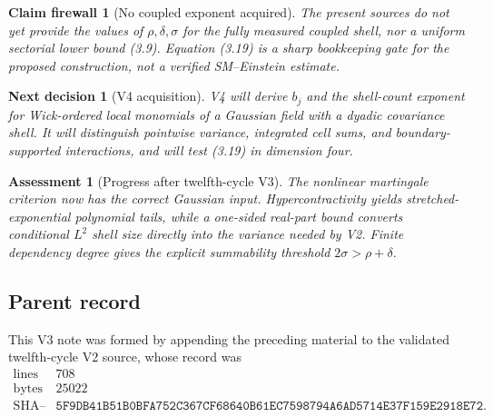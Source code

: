 \documentclass[11pt]{article}
\newtheorem{firewall}[theorem]{Claim firewall}
\newtheorem{decision}[theorem]{Next decision}
\newtheorem{assessment}[theorem]{Assessment}
\theoremstyle{remark}
\begin{document}
\begin{firewall}[No coupled exponent acquired]
\label{fire:v12v3-boundary}
The present sources do not yet provide the values of
\(\rho,\delta,\sigma\) for the fully measured coupled shell, nor a
uniform sectorial lower bound (3.9).  Equation (3.19) is a sharp
bookkeeping gate for the proposed construction, not a verified
SM--Einstein estimate.
\end{firewall}

\begin{decision}[V4 acquisition]
\label{dec:v12v3-next}
V4 will derive \(b_j\) and the shell-count exponent for Wick-ordered
local monomials of a Gaussian field with a dyadic covariance shell.
It will distinguish pointwise variance, integrated cell sums, and
boundary-supported interactions, and will test (3.19) in dimension
four.
\end{decision}

\begin{assessment}[Progress after twelfth-cycle V3]
\label{ass:v12v3-status}
The nonlinear martingale criterion now has the correct Gaussian
input.  Hypercontractivity yields stretched-exponential polynomial
tails, while a one-sided real-part bound converts conditional
\(L^2\) shell size directly into the variance needed by V2.
Finite dependency degree gives the explicit summability threshold
\(2\sigma>\rho+\delta\).
\end{assessment}

\subsection{Parent record}

This V3 note was formed by appending the preceding material to the
validated twelfth-cycle V2 source, whose record was
\[
\begin{array}{c|c}
\text{lines}&708\\
\text{bytes}&25022\\
\text{SHA--256}&
\texttt{5F9DB41B51B0BFA752C367CF68640B61EC7598794A6AD5714E37F159E2918E72}.
\end{array}                                                     \tag{3.21}
\]

\end{document}
